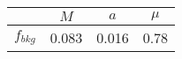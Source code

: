 \begin{tabular}{c||c|c|c}
 & $M$ & $a$ & $\mu$  \\
\hline
$f_{bkg}$  & 0.083 & 0.016 & 0.78\\
\end{tabular}
